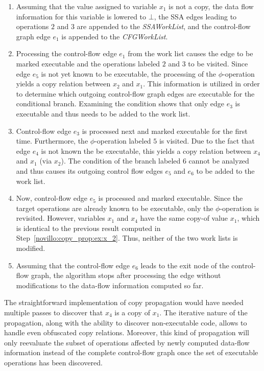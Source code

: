 \begin{enumerate}
\item Assuming that the value assigned to variable $x_1$ is not a copy, the data
      flow information for this variable is lowered to $\bot$, the SSA edges
      leading to operations $2$ and $3$ are appended to the \emph{SSAWorkList},
      and the control-flow graph edge $e_1$ is appended to the 
      \emph{CFGWorkList}.
\item \label{novillo:copy_prop:ex:x_2} Processing the control-flow edge $e_1$ 
  from the
      work list causes the edge to be marked executable and the operations
      labeled $2$ and $3$ to be visited. Since edge $e_5$ is not yet known to 
      be
      executable, the processing of the $\phi$-operation yields a copy relation
      between $x_2$ and $x_1$. This information is utilized in order to
      determine which outgoing control-flow graph edges are executable for the
      conditional branch. Examining the condition shows that only edge $e_3$ is
      executable and thus needs to be added to the work list.
\item Control-flow edge $e_3$ is processed next and marked executable for the
      first time.
      Furthermore, the $\phi$-operation labeled $5$ is visited. Due to the fact
      that edge $e_4$ is not known the be executable, this yields a
      copy relation between $x_4$ and $x_1$ (via $x_2$). The condition of the
      branch labeled $6$ cannot be analyzed and thus causes its outgoing control
      flow edges $e_5$ and $e_6$ to be added to the work list.
\item Now, control-flow edge $e_5$ is processed and marked executable. Since 
  the
      target
      operations are already known to be executable, only the $\phi$-operation
      is revisited. However, variables $x_1$ and $x_4$ have the same copy-of
      value $x_1$, which is identical to the previous result computed in
      Step~\ref{novillo:copy_prop:ex:x_2}. Thus, neither of the two work lists
      is modified.
\item Assuming that the control-flow edge $e_6$ leads to the exit node of the
      control-flow graph,
      the algorithm stops after processing the edge without modifications to
      the data-flow information computed so far.
\end{enumerate}

The straightforward implementation of copy propagation would have needed
multiple passes to discover that $x_4$ is a copy of $x_1$.  The iterative
nature of the propagation, along with the ability to discover non-executable
code, allows to handle even obfuscated copy relations. Moreover, this kind of
propagation will only reevaluate the subset of operations affected by newly
computed data-flow information instead of the complete control-flow graph once
the set of executable operations has been discovered.

